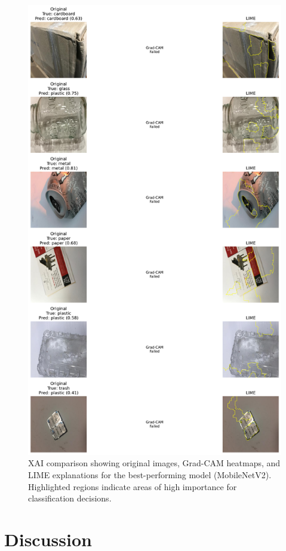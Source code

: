 \documentclass[11pt,a4paper]{article}
\begin{document}
\begin{figure}[H]
\centering
\includegraphics[width=\textwidth]{figure3_xai_comparison.png}
\caption{XAI comparison showing original images, Grad-CAM heatmaps, and LIME explanations for the best-performing model (MobileNetV2). Highlighted regions indicate areas of high importance for classification decisions.}
\label{fig:xai_comparison}
\end{figure}

\section{Discussion}
\end{document}
